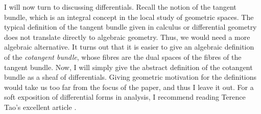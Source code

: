 I will now turn to discussing differentials. Recall the notion of the tangent
bundle, which is an integral concept in the local study of geometric spaces.
The typical definition of the tangent bundle given in calculus or
differential geometry does not translate directly to algebraic geometry.
Thus, we would need a more algebraic alternative. It turns out that it is
easier to give an algebraic definition of the \emph{cotangent bundle},
whose fibres are the dual spaces of the fibres of the tangent bundle. Now, I
will simply give the abstract definition of the cotangent bundle as a sheaf
of differentials. Giving geometric motivation for the definitions would take
us too far from the focus of the paper, and thus I leave it out. For a soft
exposition of differential forms in analysis, I recommend reading Terence
Tao's excellent article \cite{tao}.


